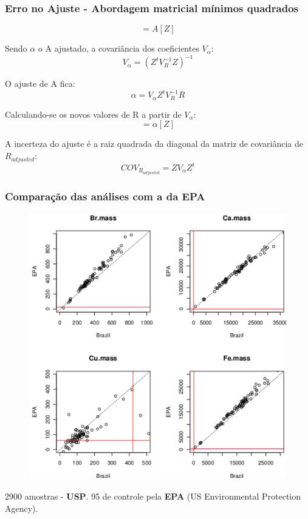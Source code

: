 \begin{frame}
  \frametitle{Erro no Ajuste - Abordagem matricial mínimos quadrados}
   \begin{equation}
     [R] = A[Z]
   \end{equation}
   
   Sendo $\alpha$ o A ajustado, a covariância dos coeficientes $V_{\alpha}$:
   \begin{equation}
     V_{\alpha} = (Z^t V_R^{-1} Z)^{-1}
   \end{equation}

   O ajuste de A fica:
   \begin{equation}
     \alpha = V_{\alpha} Z^t V_R^{-1} R
   \end{equation}

    Calculando-se os novos valores de R a partir de $V_{\alpha}$:
   \begin{equation}
     [R_{adjusted}] = \alpha[Z]
   \end{equation} 

    A incerteza do ajuste é a raiz quadrada da diagonal da matriz de covariância de $R_{adjusted}$:
   \begin{equation}
     COV_{R_{adjusted}} = Z V_{\alpha} Z^t
   \end{equation} 
\end{frame}

\begin{frame}
  \frametitle{Comparação das análises com a da \textbf{EPA}}
  \begin{figure}[H]
   \centering
    \includegraphics[scale=0.42]{../../inputs/images/zheng/epa_short_example.PDF}
  \end{figure}
  \begin{tiny}
    2900 amostras - \textbf{USP}. 
    95 de controle pela \textbf{EPA} (US Environmental Protection Agency).
  \end{tiny}
\end{frame}
